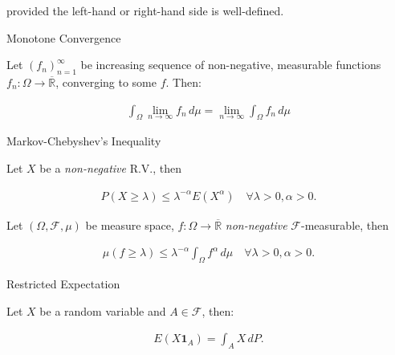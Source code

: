\documentclass[10pt,landscape]{article}
\renewcommand{\leq}{\leqslant}
\renewcommand{\geq}{\geqslant}
\newcommand{\Indicator}[1]{\mathbf{1}_{#1}}
\newcommand{\CalF}{\mathcal{F}}
\begin{document}
\begin{multicols}{3}
\begin{exercise}{3.6}{}
\begin{enumerate}[(i)]
            provided the left-hand or right-hand side is well-defined.
        \end{enumerate}

\end{exercise}

\begin{theorem}{3.8}{Monotone Convergence}

    Let $(f_n)_{n=1}^{\infty}$ be increasing sequence of non-negative, measurable functions $f_n: \Omega \to \overline{\mathbb{R}}$, converging to some $f$. Then:

        \begin{align*}
            \int_{\Omega} \lim_{n \to \infty} f_n \,d\mu = \lim_{n \to \infty} \int_{\Omega} f_n \,d\mu
        \end{align*}

\end{theorem}

\begin{proposition}{3.18}{Markov-Chebyshev's Inequality}

    Let $X$ be a \emph{non-negative} R.V., then

        \begin{align*}
            P(X \geq \lambda) \leq \lambda^{-\alpha} E(X^{\alpha}) \quad \forall \lambda > 0, \alpha > 0.
        \end{align*}

\end{proposition}

\begin{remark}{3.3}{}

    Let $(\Omega, \mathcal{F}, \mu)$ be measure space, $f: \Omega \to \overline{\mathbb{R}}$ \emph{non-negative} $\mathcal{F}$-measurable, then

        \begin{align*}
            \mu(f \geq \lambda) \leq \lambda^{-\alpha} \int_{\Omega} f^{\alpha} \,d\mu \quad \forall \lambda > 0, \alpha > 0.
        \end{align*}

\end{remark}

\begin{proposition}{}{Restricted Expectation}

    Let $X$ be a random variable and $A \in \CalF$, then:

        \begin{align*}
            E(X \Indicator{A}) = \int_A X \,dP.
        \end{align*}


\end{proposition}
\end{multicols}
\end{document}
